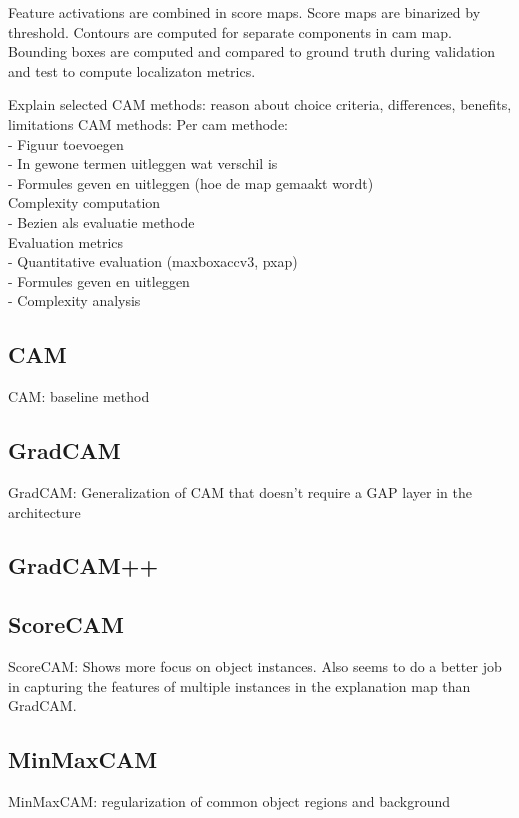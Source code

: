  Feature activations are combined in score maps. Score maps are binarized by threshold. Contours are computed for separate components in cam map. Bounding boxes are computed and compared to ground truth during validation and test to compute localizaton metrics.

Explain selected CAM methods: reason about choice criteria, differences, benefits, limitations
CAM methods: Per cam methode: \\
- Figuur toevoegen \\
- In gewone termen uitleggen wat verschil is \\
- Formules geven en uitleggen (hoe de map gemaakt wordt) \\
Complexity computation \\
- Bezien als evaluatie methode \\
Evaluation metrics \\
- Quantitative evaluation (maxboxaccv3, pxap) \\
- Formules geven en uitleggen \\
- Complexity analysis \\

\subsection{CAM}
CAM: baseline method

\subsection{GradCAM}
GradCAM: Generalization of CAM that doesn’t require a GAP layer in the architecture

\subsection{GradCAM++}

\subsection{ScoreCAM}
ScoreCAM: Shows more focus on object instances. Also seems to do a better job in capturing the features of multiple instances in the explanation map than GradCAM.

\subsection{MinMaxCAM}
MinMaxCAM: regularization of common object regions and background

